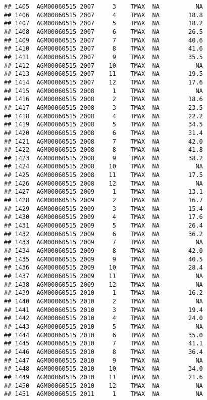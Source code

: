 \documentclass{article}\usepackage[]{graphicx}\usepackage[]{color}
\makeatletter
\newenvironment{kframe}{%
 \def\at@end@of@kframe{}%
 \ifinner\ifhmode%
  \def\at@end@of@kframe{\end{minipage}}%
  \begin{minipage}{\columnwidth}%
 \fi\fi%
 \def\FrameCommand##1{\hskip\@totalleftmargin \hskip-\fboxsep
 \colorbox{shadecolor}{##1}\hskip-\fboxsep
     \hskip-\linewidth \hskip-\@totalleftmargin \hskip\columnwidth}%
 \MakeFramed {\advance\hsize-\width
   \@totalleftmargin\z@ \linewidth\hsize
   \@setminipage}}%
 {\par\unskip\endMakeFramed%
 \at@end@of@kframe}
\newenvironment{knitrout}{}{} %
\makeatother
\begin{document}
\begin{knitrout}
\begin{kframe}
\begin{verbatim}
## 1405  AGM00060515 2007     3    TMAX  NA          NA
## 1406  AGM00060515 2007     4    TMAX  NA        18.8
## 1407  AGM00060515 2007     5    TMAX  NA        18.2
## 1408  AGM00060515 2007     6    TMAX  NA        26.5
## 1409  AGM00060515 2007     7    TMAX  NA        40.6
## 1410  AGM00060515 2007     8    TMAX  NA        41.6
## 1411  AGM00060515 2007     9    TMAX  NA        35.5
## 1412  AGM00060515 2007    10    TMAX  NA          NA
## 1413  AGM00060515 2007    11    TMAX  NA        19.5
## 1414  AGM00060515 2007    12    TMAX  NA        17.6
## 1415  AGM00060515 2008     1    TMAX  NA          NA
## 1416  AGM00060515 2008     2    TMAX  NA        18.6
## 1417  AGM00060515 2008     3    TMAX  NA        23.5
## 1418  AGM00060515 2008     4    TMAX  NA        22.2
## 1419  AGM00060515 2008     5    TMAX  NA        34.5
## 1420  AGM00060515 2008     6    TMAX  NA        31.4
## 1421  AGM00060515 2008     7    TMAX  NA        42.0
## 1422  AGM00060515 2008     8    TMAX  NA        41.8
## 1423  AGM00060515 2008     9    TMAX  NA        38.2
## 1424  AGM00060515 2008    10    TMAX  NA          NA
## 1425  AGM00060515 2008    11    TMAX  NA        17.5
## 1426  AGM00060515 2008    12    TMAX  NA          NA
## 1427  AGM00060515 2009     1    TMAX  NA        13.1
## 1428  AGM00060515 2009     2    TMAX  NA        16.7
## 1429  AGM00060515 2009     3    TMAX  NA        15.4
## 1430  AGM00060515 2009     4    TMAX  NA        17.6
## 1431  AGM00060515 2009     5    TMAX  NA        26.4
## 1432  AGM00060515 2009     6    TMAX  NA        36.2
## 1433  AGM00060515 2009     7    TMAX  NA          NA
## 1434  AGM00060515 2009     8    TMAX  NA        42.0
## 1435  AGM00060515 2009     9    TMAX  NA        40.5
## 1436  AGM00060515 2009    10    TMAX  NA        28.4
## 1437  AGM00060515 2009    11    TMAX  NA          NA
## 1438  AGM00060515 2009    12    TMAX  NA          NA
## 1439  AGM00060515 2010     1    TMAX  NA        16.2
## 1440  AGM00060515 2010     2    TMAX  NA          NA
## 1441  AGM00060515 2010     3    TMAX  NA        19.4
## 1442  AGM00060515 2010     4    TMAX  NA        24.0
## 1443  AGM00060515 2010     5    TMAX  NA          NA
## 1444  AGM00060515 2010     6    TMAX  NA        35.0
## 1445  AGM00060515 2010     7    TMAX  NA        41.1
## 1446  AGM00060515 2010     8    TMAX  NA        36.4
## 1447  AGM00060515 2010     9    TMAX  NA          NA
## 1448  AGM00060515 2010    10    TMAX  NA        34.0
## 1449  AGM00060515 2010    11    TMAX  NA        21.6
## 1450  AGM00060515 2010    12    TMAX  NA          NA
## 1451  AGM00060515 2011     1    TMAX  NA          NA

\end{verbatim}
\end{kframe}
\end{knitrout}
\end{document}
